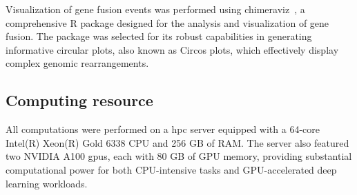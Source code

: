 \documentclass[pdflatex,sn-nature, lineno]{sn-jnl}%
\theoremstyle{thmstyleone}%
\theoremstyle{thmstyletwo}%
\theoremstyle{thmstylethree}%
\begin{document}
Visualization of gene fusion events was performed using chimeraviz~\cite{laagstad2017chimeraviz}, a comprehensive R package designed for the analysis and visualization of gene fusion. 
The package was selected for its robust capabilities in generating informative circular plots, also known as Circos plots, which effectively display complex genomic rearrangements.

\subsection{Computing resource}

All computations were performed on a \gls{hpc} server equipped with a 64-core Intel(R) Xeon(R) Gold 6338 CPU and 256 GB of RAM.
The server also featured two NVIDIA A100 \glspl{gpu}, each with 80 GB of GPU memory, providing substantial computational power for both CPU-intensive tasks and GPU-accelerated deep learning workloads.





\end{document}
